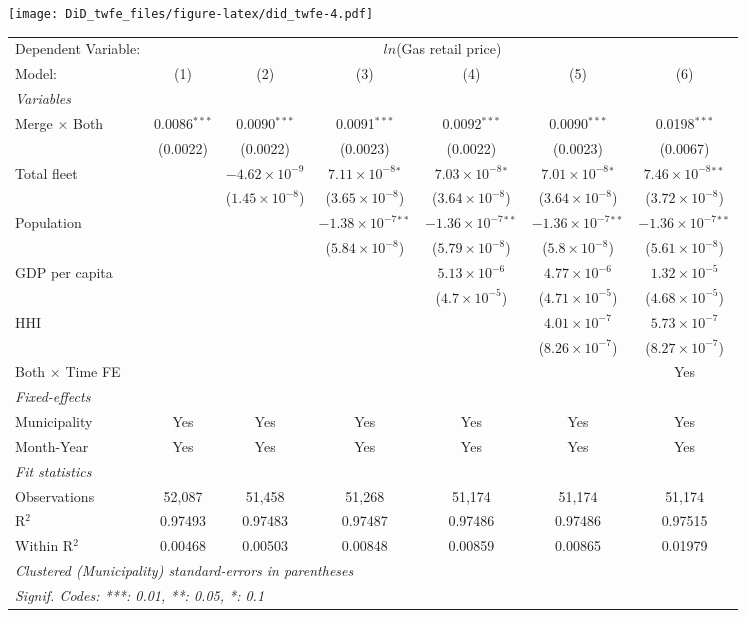 \documentclass[
]{article}
\begin{document}
\texttt{[image: DiD\_twfe\_files/figure-latex/did\_twfe-4.pdf]}

\begin{tabular}{lcccccc}
\tabularnewline\midrule\midrule
Dependent Variable:&\multicolumn{6}{c}{$ln$(Gas retail price)}\\
Model:&(1) & (2) & (3) & (4) & (5) & (6)\\
\midrule \emph{Variables}&   &   &   &   &   &  \\
Merge $\times $ Both & 0.0086$^{***}$ & 0.0090$^{***}$ & 0.0091$^{***}$ & 0.0092$^{***}$ & 0.0090$^{***}$ & 0.0198$^{***}$\\
  &(0.0022) & (0.0022) & (0.0023) & (0.0022) & (0.0023) & (0.0067)\\
Total fleet &    & $-4.62\times 10^{-9}$ & $7.11\times 10^{-8}$$^{*}$ & $7.03\times 10^{-8}$$^{*}$ & $7.01\times 10^{-8}$$^{*}$ & $7.46\times 10^{-8}$$^{**}$\\
  &   & ($1.45\times 10^{-8}$) & ($3.65\times 10^{-8}$) & ($3.64\times 10^{-8}$) & ($3.64\times 10^{-8}$) & ($3.72\times 10^{-8}$)\\
Population &    &    & $-1.38\times 10^{-7}$$^{**}$ & $-1.36\times 10^{-7}$$^{**}$ & $-1.36\times 10^{-7}$$^{**}$ & $-1.36\times 10^{-7}$$^{**}$\\
  &   &    & ($5.84\times 10^{-8}$) & ($5.79\times 10^{-8}$) & ($5.8\times 10^{-8}$) & ($5.61\times 10^{-8}$)\\
GDP per capita &    &    &    & $5.13\times 10^{-6}$ & $4.77\times 10^{-6}$ & $1.32\times 10^{-5}$\\
  &   &    &    & ($4.7\times 10^{-5}$) & ($4.71\times 10^{-5}$) & ($4.68\times 10^{-5}$)\\
HHI &    &    &    &    & $4.01\times 10^{-7}$ & $5.73\times 10^{-7}$\\
  &   &    &    &    & ($8.26\times 10^{-7}$) & ($8.27\times 10^{-7}$)\\
Both $\times$ Time FE &  &  &  &  &  & Yes\\
\midrule \emph{Fixed-effects}&   &   &   &   &   &  \\
Municipality & Yes & Yes & Yes & Yes & Yes & Yes\\
Month-Year & Yes & Yes & Yes & Yes & Yes & Yes\\
\midrule \emph{Fit statistics}&  & & & & & \\
Observations & 52,087&51,458&51,268&51,174&51,174&51,174\\
R$^2$ & 0.97493&0.97483&0.97487&0.97486&0.97486&0.97515\\
Within R$^2$ & 0.00468&0.00503&0.00848&0.00859&0.00865&0.01979\\
\midrule\midrule\multicolumn{7}{l}{\emph{Clustered (Municipality) standard-errors in parentheses}}\\
\multicolumn{7}{l}{\emph{Signif. Codes: ***: 0.01, **: 0.05, *: 0.1}}\\
\end{tabular}
\end{document}
